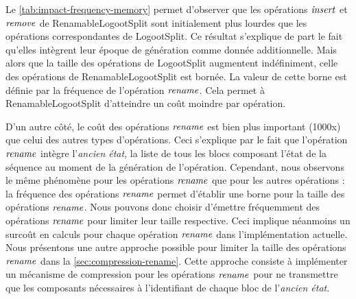 Le \autoref{tab:impact-frequency-memory} permet d'observer que les opérations $\mathit{insert}$ et $\mathit{remove}$ de RenamableLogootSplit sont initialement plus lourdes que les opérations correspondantes de LogootSplit.
Ce résultat s'explique de part le fait qu'elles intègrent leur époque de génération comme donnée additionnelle.
Mais alors que la taille des opérations de LogootSplit augmentent indéfiniment, celle des opérations de RenamableLogootSplit est bornée.
La valeur de cette borne est définie par la fréquence de l'opération $\mathit{rename}$.
Cela permet à RenamableLogootSplit d'atteindre un coût moindre par opération.

D'un autre côté, le coût des opérations $\mathit{rename}$ est bien plus important (1000x) que celui des autres types d'opérations.
Ceci s'explique par le fait que l'opération $\mathit{rename}$ intègre l'\emph{ancien état}, \ie la liste de tous les blocs composant l'état de la séquence au moment de la génération de l'opération.
Cependant, nous observons le même phénomène pour les opérations $\mathit{rename}$ que pour les autres opérations : la fréquence des opérations $\mathit{rename}$ permet d'établir une borne pour la taille des opérations $\mathit{rename}$.
Nous pouvons donc choisir d'émettre fréquemment des opérations $\mathit{rename}$ pour limiter leur taille respective.
Ceci implique néanmoins un surcoût en calculs pour chaque opération $\mathit{rename}$ dans l'implémentation actuelle.
Nous présentons une autre approche possible pour limiter la taille des opérations $\mathit{rename}$ dans la \autoref{sec:compression-rename}.
Cette approche consiste à implémenter un mécanisme de compression pour les opérations $\mathit{rename}$ pour ne transmettre que les composants nécessaires à l'identifiant de chaque bloc de l'\emph{ancien état}.
